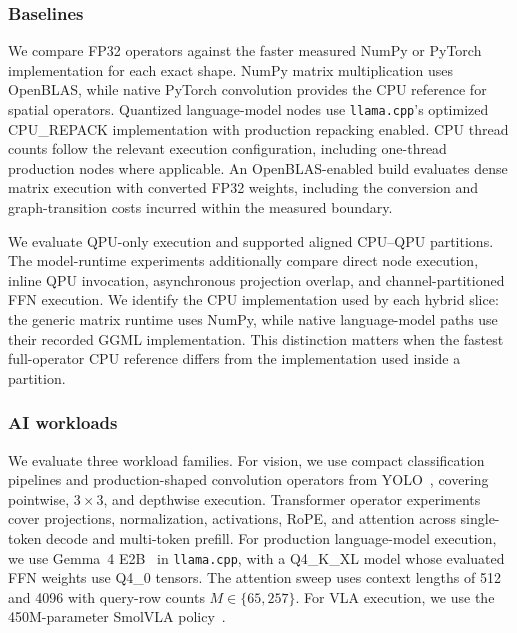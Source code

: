 \documentclass[sigplan,screen,review]{acmart}
\begin{document}

\subsubsection{Baselines}
We compare FP32 operators against the faster measured NumPy or PyTorch implementation for each exact shape. NumPy matrix multiplication uses OpenBLAS, while native PyTorch convolution provides the CPU reference for spatial operators. Quantized language-model nodes use \texttt{llama.cpp}'s optimized CPU\_REPACK implementation with production repacking enabled. CPU thread counts follow the relevant execution configuration, including one-thread production nodes where applicable. An OpenBLAS-enabled build evaluates dense matrix execution with converted FP32 weights, including the conversion and graph-transition costs incurred within the measured boundary.

We evaluate QPU-only execution and supported aligned CPU--QPU partitions. The model-runtime experiments additionally compare direct node execution, inline QPU invocation, asynchronous projection overlap, and channel-partitioned FFN execution. We identify the CPU implementation used by each hybrid slice: the generic matrix runtime uses NumPy, while native language-model paths use their recorded GGML implementation. This distinction matters when the fastest full-operator CPU reference differs from the implementation used inside a partition.

\subsubsection{AI workloads}

We evaluate three workload families. For vision, we use compact classification pipelines and production-shaped convolution operators from YOLO~\cite{redmon2016yolo}, covering pointwise, $3\times3$, and depthwise execution. Transformer operator experiments cover projections, normalization, activations, RoPE, and attention across single-token decode and multi-token prefill. For production language-model execution, we use Gemma~4 E2B~\cite{gemma4} in \texttt{llama.cpp}, with a Q4\_K\_XL model whose evaluated FFN weights use Q4\_0 tensors. The attention sweep uses context lengths of 512 and 4096 with query-row counts $M\in\{65,257\}$. For VLA execution, we use the 450M-parameter SmolVLA policy~\cite{smolvla}.
\end{document}
